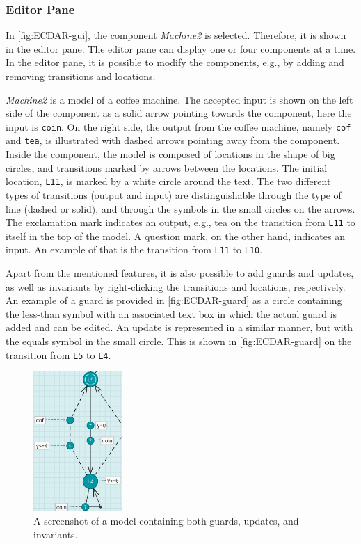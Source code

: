 \subsubsection{Editor Pane}
In \autoref{fig:ECDAR-gui}, the component \textit{Machine2} is selected. Therefore, it is shown in the editor pane. The editor pane can display one or four components at a time.
In the editor pane, it is possible to modify the components, e.g., by adding and removing transitions and locations.


\textit{Machine2} is a model of a coffee machine. The accepted input is shown on the left side of the component as a solid arrow pointing towards the component, here the input is \texttt{coin}. On the right side, the output from the coffee machine, namely \texttt{cof} and \texttt{tea}, is illustrated with dashed arrows pointing away from the component. 
Inside the component, the model is composed of locations in the shape of big circles, and transitions marked by arrows between the locations. The initial location, \texttt{L11}, is marked by a white circle around the text.
The two different types of transitions (output and input) are distinguishable through the type of line (dashed or solid), and through the symbols in the small circles on the arrows. The exclamation mark indicates an output, e.g., tea on the transition from \texttt{L11} to itself in the top of the model. A question mark, on the other hand, indicates an input. An example of that is the transition from \texttt{L11} to \texttt{L10}.

Apart from the mentioned features, it is also possible to add guards and updates, as well as invariants by right-clicking the transitions and locations, respectively. An example of a guard is provided in \autoref{fig:ECDAR-guard} as a circle containing the less-than symbol with an associated text box in which the actual guard is added and can be edited. 
An update is represented in a similar manner, but with the equals symbol in the small circle. This is shown in \autoref{fig:ECDAR-guard} on the transition from \texttt{L5} to \texttt{L4}.

\begin{figure}[H]
    \centering
    \includegraphics[width=0.3\textwidth]{common/figures/ecdar-guards.jpg}
    \caption{A screenshot of a model containing both guards, updates, and invariants.}
    \label{fig:ECDAR-guard}
\end{figure}

